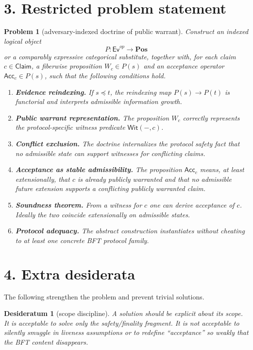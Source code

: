 \documentclass[11pt]{article}
\newtheorem{problem}{Problem}
\newtheorem{desideratum}{Desideratum}
\newcommand{\Acc}{\mathsf{Acc}}
\newcommand{\Wit}{\mathsf{Wit}}
\newcommand{\Claim}{\mathsf{Claim}}
\newcommand{\Ev}{\mathsf{Ev}}
\begin{document}
\section*{3. Restricted problem statement}
\begin{problem}[adversary-indexed doctrine of public warrant]
Construct an indexed logical object
\[
P : \Ev^{op} \longrightarrow \mathbf{Pos}
\]
or a comparably expressive categorical substitute, together with, for each claim $c\in \Claim$, a fiberwise proposition $W_c\in P(s)$ and an acceptance operator $\Acc_c\in P(s)$, such that the following conditions hold.

\begin{enumerate}[label=\textbf{P\arabic*.}]
    \item \textbf{Evidence reindexing.} If $s\preceq t$, the reindexing map $P(s)\to P(t)$ is functorial and interprets admissible information growth.
    \item \textbf{Public warrant representation.} The proposition $W_c$ correctly represents the protocol-specific witness predicate $\Wit(-,c)$.
    \item \textbf{Conflict exclusion.} The doctrine internalizes the protocol safety fact that no admissible state can support witnesses for conflicting claims.
    \item \textbf{Acceptance as stable admissibility.} The proposition $\Acc_c$ means, at least extensionally, that $c$ is already publicly warranted and that no admissible future extension supports a conflicting publicly warranted claim.
    \item \textbf{Soundness theorem.} From a witness for $c$ one can derive acceptance of $c$. Ideally the two coincide extensionally on admissible states.
    \item \textbf{Protocol adequacy.} The abstract construction instantiates without cheating to at least one concrete BFT protocol family.
\end{enumerate}
\end{problem}

\section*{4. Extra desiderata}
The following strengthen the problem and prevent trivial solutions.

\begin{desideratum}[scope discipline]
A solution should be explicit about its scope. It is acceptable to solve only the safety/finality fragment. It is not acceptable to silently smuggle in liveness assumptions or to redefine ``acceptance'' so weakly that the BFT content disappears.
\end{desideratum}
\end{document}

